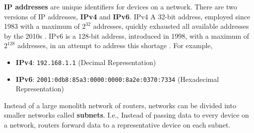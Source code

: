 \begin{Def}[IP Addressing]

    \textbf{IP addresses} are unique identifiers for devices on a network. 
    There are two versions of IP addresses, \textbf{IPv4} and \textbf{IPv6}.
    IPv4 A 32-bit address, employed since 1983 with a maximum of $2^{32}$ addresses, quickly exhausted all available addresses by the 2010s \cite{info12060246}.
    IPv6 is a 128-bit address, introduced in 1998, with a maximum of $2^{128}$ addresses, in an attempt to address this shortage \cite{deering_ipv6_specification}.
    For example,
    \begin{itemize}
        \item \textbf{IPv4}: \texttt{192.168.1.1} (Decimal Representation)
        \item \textbf{IPv6}: \texttt{2001:0db8:85a3:0000:0000:8a2e:0370:7334} (Hexadecimal Representation)
    \end{itemize}
    \noindent
\end{Def}

\newpage


\begin{Def}[Subnets]

    Instead of a large monolith network of routers, networks can be divided into 
    smaller networks called \textbf{subnets}. I.e., Instead of passing data to every device on a network, routers forward data to a representative device on each subnet.
\end{Def}
    



